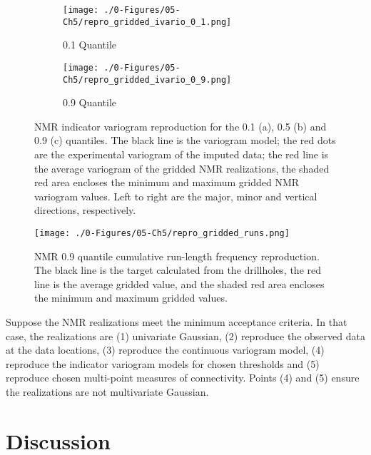 \begin{figure}
    \begin{subfigure}{1.0\textwidth}
        \centering
        \texttt{[image: ./0-Figures/05-Ch5/repro\_gridded\_ivario\_0\_1.png]}
        \caption{0.1 Quantile}
    \end{subfigure}
    \begin{subfigure}{1.0\textwidth}
        \centering
        \texttt{[image: ./0-Figures/05-Ch5/repro\_gridded\_ivario\_0\_9.png]}
        \caption{0.9 Quantile}
    \end{subfigure}
    \caption{\gls{NMR} indicator variogram reproduction for the 0.1 (a), 0.5 (b) and 0.9 (c) quantiles. The black line is the variogram model; the red dots are the experimental variogram of the imputed data; the red line is the average variogram of the gridded \gls{NMR} realizations, the shaded red area encloses the minimum and maximum gridded \gls{NMR} variogram values. Left to right are the major, minor and vertical directions, respectively.}
    \label{fig:repro_gridded_ivario_ch5}
\end{figure}

\begin{figure}[htb!]
    \centering
    \texttt{[image: ./0-Figures/05-Ch5/repro\_gridded\_runs.png]}
    \caption{\gls{NMR} 0.9 quantile cumulative run-length frequency reproduction. The black line is the target calculated from the drillholes, the red line is the average gridded value, and the shaded red area encloses the minimum and maximum gridded values. }
    \label{fig:repro_gridded_runs_ch5}
\end{figure}

Suppose the \gls{NMR} realizations meet the minimum acceptance criteria. In that case, the realizations are (1) univariate Gaussian, (2) reproduce the observed data at the data locations, (3) reproduce the continuous variogram model, (4) reproduce the indicator variogram models for chosen thresholds and (5) reproduce chosen multi-point measures of connectivity. Points (4) and (5) ensure the realizations are not multivariate Gaussian.

\FloatBarrier
\section{Discussion}
\label{sec:discuss05}

